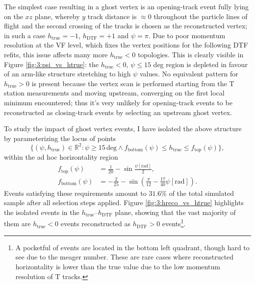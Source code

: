 The simplest case resulting in a ghost vertex is an opening-track \lambdadecay event fully lying on the $xz$ plane, whereby $y$ track distance is $\approx 0$ throughout the particle lines of flight and the second crossing of the tracks is chosen as the reconstructed vertex;
in such a case $h_\text{true} = -1$, $h_\text{DTF}=+1$ and $\psi = \pi$.
Due to poor momentum resolution at the VF level, which fixes the vertex positions for the following DTF refits, this issue affects many more $h_\text{true} < 0$ topologies.
This is clearly visible in Figure \ref{fig:3:psi_vs_htrue}: the $h_\text{true} < 0$, $\psi \leq 15$ deg region is depleted in favour of an arm-like structure stretching to high $\psi$ values.
No equivalent pattern for $h_\text{true} > 0$ is present because the vertex scan is performed starting from the T station measurements and moving upstream, converging on the first local minimum encountered;
thus it's very unlikely for opening-track events to be reconstructed as closing-track events by selecting an upstream ghost vertex.

To study the impact of ghost vertex events, I have isolated the above structure by parameterizing the locus of points
\begin{equation}
	\big\{ \left(\psi, h_\text{true} \right) \in \mathbb{R}^2
	: 
	\psi \geq 15\,\text{deg}
	\land
	f_\text{bottom}(\psi) \leq h_\text{true} \leq f_\text{top}(\psi)
	\big\},
	\label{eq:3:psih_banana}
\end{equation}
within the ad hoc horizontality region
\begin{subequations}
\begin{align}
	f_\text{top}(\psi) &= \frac{1}{20} - \sin\frac{\psi \left[\text{rad}\right]}{2}, \\
	f_\text{bottom}(\psi) &= - \frac{2}{25} - \sin\left(
	\frac{\pi}{12}
	-
	\frac{17}{40} \psi \left[\text{rad}\right]
	\right).
\end{align}
\end{subequations}
Events satisfying these requirements amount to $31.6\%$ of the total simulated sample after all selection steps applied.
Figure \ref{fig:3:hreco_vs_htrue} highlights the isolated events in the $h_\text{true}$--$h_\text{DTF}$ plane, showing that the vast majority of them are $h_\text{true} < 0$ events reconstructed as $h_\text{DTF} > 0$ events\footnote{A pocketful of events are located in the bottom left quadrant, though hard to see due to the meager number. These are rare cases where reconstructed horizontality is lower than the true value due to the low momentum resolution of T tracks.}.


